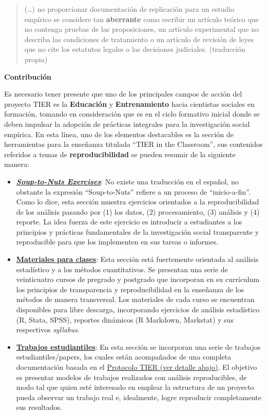 \documentclass[
  spanish,
  letterpaper,
  DIV=11,
  numbers=noendperiod]{scrreprt}
\begin{document}
\begin{quote}
(\ldots) no proporcionar documentación de replicación para un estudio
empírico se considere tan \textbf{aberrante} como escribir un artículo
teórico que no contenga pruebas de las proposiciones, un artículo
experimental que no describa las condiciones de tratamiento o un
artículo de revisión de leyes que no cite los estatutos legales o las
decisiones judiciales. (traducción propia)
\end{quote}

\textbf{Contribución}

Es necesario tener presente que uno de los principales campos de acción
del proyecto TIER es la \textbf{Educación} y \textbf{Entrenamiento}
hacia cientistas sociales en formación, tomando en consideración que es
en el ciclo formativo inicial donde se deben impulsar la adopción de
prácticas integrales para la investigación social empírica. En esta
línea, uno de los elementos destacables es la sección de herramientas
para la enseñanza titulada ``TIER in the Classroom'', sus contenidos
referidos a temas de \textbf{reproducibilidad} se pueden resumir de la
siguiente manera:

\begin{itemize}
\item
  \href{https://www.projecttier.org/tier-classroom/soup-nuts-exercises/}{\textbf{\emph{Soup-to-Nuts
  Exercises}}}: No existe una traducción en el español, no obstante la
  expresión ``Soup-to-Nuts'' refiere a un proceso de ``inicio-a-fin''.
  Como lo dice, esta sección muestra ejercicios orientados a la
  reproducibilidad de los análisis pasando por (1) los datos, (2)
  procesamiento, (3) análisis y (4) reporte. La idea fuerza de este
  ejercicio es introducir a estudiantes a los principios y prácticas
  fundamentales de la investigación social transparente y reproducible
  para que los implementen en sus tareas o informes.
\item
  \href{https://www.projecttier.org/tier-classroom/course-materials/}{\textbf{Materiales
  para clases}}: Esta sección está fuertemente orientada al análisis
  estadístico y a los métodos cuantitativos. Se presentan una serie de
  veinticuatro cursos de pregrado y postgrado que incorporan en su
  currículum los principios de transparencia y reproducibilidad en la
  enseñanza de los métodos de manera transversal. Los materiales de cada
  curso se encuentran disponibles para libre descarga, incorporando
  ejercicios de análisis estadístico (R, Stata, SPSS), reportes
  dinámicos (R Markdown, Markstat) y sus respectivos \emph{syllabus}.
\item
  \href{https://www.projecttier.org/tier-classroom/student-work/\#student-papers}{\textbf{Trabajos
  estudiantiles}}: En esta sección se incorporan una serie de trabajos
  estudiantiles/papers, los cuales están acompañados de una completa
  documentación basada en el
  \href{https://www.projecttier.org/tier-protocol/}{Protocolo TIER (ver
  detalle abajo)}. El objetivo es presentar modelos de trabajos
  realizados con análisis reproducibles, de modo tal que quien esté
  interesado en emplear la estructura de un proyecto pueda observar un
  trabajo real e, idealmente, logre reproducir completamente sus
  resultados.
\end{itemize}
\end{document}
